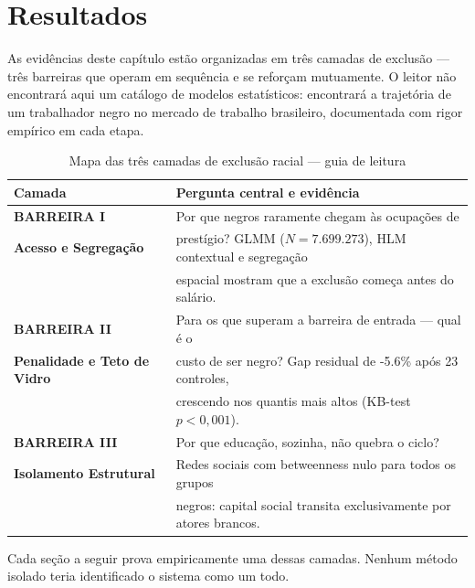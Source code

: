 \documentclass[12pt, a4paper, oneside]{article}
\begin{document}
\section{Resultados}
\label{sec:resultados}

As evidências deste capítulo estão organizadas em três camadas de exclusão
--- três barreiras que operam em sequência e se reforçam mutuamente.
O leitor não encontrará aqui um catálogo de modelos estatísticos:
encontrará a trajetória de um trabalhador negro no mercado de trabalho
brasileiro, documentada com rigor empírico em cada etapa.

\begin{table}[ht]
\centering
\caption{Mapa das três camadas de exclusão racial --- guia de leitura}
\label{tab:mapa_barreiras}
\begin{tabularx}{\textwidth}{|l|X|}
\hline
\textbf{Camada} & \textbf{Pergunta central e evidência} \\
\hline
\textbf{BARREIRA I} & Por que negros raramente chegam às ocupações de \\
\textbf{Acesso e Segregação} & prestígio? GLMM ($N=7.699.273$), HLM contextual e segregação \\
 & espacial mostram que a exclusão começa antes do salário. \\
\hline
\textbf{BARREIRA II} & Para os que superam a barreira de entrada --- qual é o \\
\textbf{Penalidade e Teto de Vidro} & custo de ser negro? Gap residual de -5.6\% após 23 controles, \\
 & crescendo nos quantis mais altos (KB-test $p<0{,}001$). \\
\hline
\textbf{BARREIRA III} & Por que educação, sozinha, não quebra o ciclo? \\
\textbf{Isolamento Estrutural} & Redes sociais com betweenness nulo para todos os grupos \\
 & negros: capital social transita exclusivamente por atores brancos. \\
\hline
\end{tabularx}
\end{table}

\medskip

Cada seção a seguir prova empiricamente uma dessas camadas.
Nenhum método isolado teria identificado o sistema como um todo.
\end{document}
